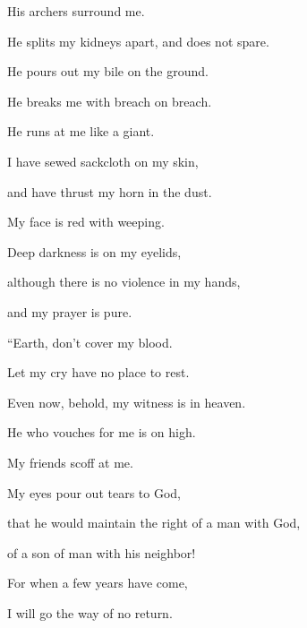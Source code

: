 {\par }{\Q {}His archers surround me.
\par }{\QB He splits my kidneys apart, and does not spare.
\par }{\QB He pours out my bile on the ground.
\par }{\Q {}He breaks me with breach on breach.
\par }{\QB He runs at me like a giant.
\par }{\Q {}I have sewed sackcloth on my skin,
\par }{\QB and have thrust my horn in the dust.
\par }{\Q {}My face is red with weeping.
\par }{\QB Deep darkness is on my eyelids,
\par }{\Q {}although there is no violence in my hands,
\par }{\QB and my prayer is pure.
\par }{\BB \par }{\Q {}“Earth, don’t cover my blood.
\par }{\QB Let my cry have no place to rest.
\par }{\Q {}Even now, behold, my witness is in heaven.
\par }{\QB He who vouches for me is on high.
\par }{\Q {}My friends scoff at me.
\par }{\QB My eyes pour out tears to God,
\par }{\Q {}that he would maintain the right of a man with God,
\par }{\QB of a son of man with his neighbor!
\par }{\Q {}For when a few years have come,
\par }{\QB I will go the way of no return.
\par }{\BB \par }
